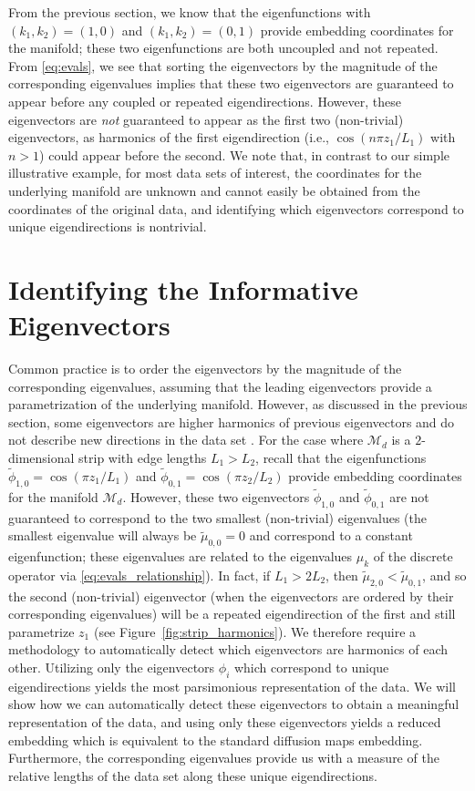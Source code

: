 From the previous section, we know that the eigenfunctions with $(k_1, k_2) =(1, 0)$ and $(k_1, k_2) =(0, 1)$ provide embedding coordinates for the manifold; these two eigenfunctions are both uncoupled and not repeated.
%
From \eqref{eq:evals}, we see that sorting the eigenvectors by the magnitude of the corresponding eigenvalues implies that these two eigenvectors are guaranteed to appear before any coupled or repeated eigendirections.
%
However, these eigenvectors are {\em not} guaranteed to appear as the first two (non-trivial) eigenvectors, as harmonics of the first eigendirection (i.e., $\cos \left( n \pi z_1 / L_1 \right)$ with $n > 1$) could appear before the second.
%
We note that, in contrast to our simple illustrative example, for most data sets of interest, the coordinates for the underlying manifold are unknown and cannot easily be obtained from the coordinates of the original data, and identifying which eigenvectors correspond to unique eigendirections is nontrivial.

\section{Identifying the Informative Eigenvectors }

Common practice is to order the eigenvectors by the magnitude of the corresponding eigenvalues, assuming that the leading eigenvectors provide a parametrization of the underlying manifold.
%
However, as discussed in the previous section, some eigenvectors are higher harmonics of previous eigenvectors and do not describe new directions in the data set \cite{gerber2007robust}.
%
For the case where $\mathcal{M}_d$ is a $2$-dimensional strip with edge lengths $L_1  > L_2$, recall that the eigenfunctions $\tilde{\phi}_{1,0} = \cos \left(  {\pi z_1}/{L_1} \right)$ and  $\tilde{\phi}_{0,1} = \cos \left(  {\pi z_2}/{L_2} \right)$ provide embedding coordinates for the manifold $\mathcal{M}_d$.
%
However, these two eigenvectors $\tilde{\phi}_{1, 0}$ and $\tilde{\phi}_{0, 1}$ are not guaranteed to correspond to the two smallest (non-trivial) eigenvalues (the smallest eigenvalue will always be $\tilde{\mu}_{0,0} = 0$ and correspond to a constant eigenfunction; these eigenvalues are related to the eigenvalues $\mu_k$ of the discrete operator via \eqref{eq:evals_relationship}).
%
In fact, if $L_1 > 2 L_2$, then $\tilde{\mu}_{2, 0} < \tilde{\mu}_{0, 1}$, and so the second (non-trivial) eigenvector (when the eigenvectors are ordered by their corresponding eigenvalues) will be a repeated eigendirection of the first and still parametrize $z_1$ (see Figure~\ref{fig:strip_harmonics}).
%
We therefore require a methodology to automatically detect which eigenvectors are harmonics of each other.
%
Utilizing only the eigenvectors $\phi_i$ which correspond to unique eigendirections yields the most parsimonious representation of the data.
%
We will show how we can automatically detect these eigenvectors to obtain a meaningful representation of the data, and using only these eigenvectors yields a reduced embedding which is equivalent to the standard diffusion maps embedding.
%
Furthermore, the corresponding eigenvalues provide us with a measure of the relative lengths of the data set along these unique eigendirections.


